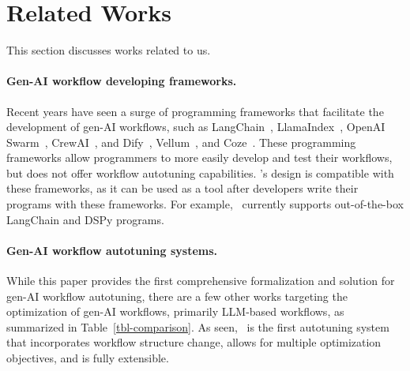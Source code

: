\section{Related Works}
\label{sec:related}
This section discusses works related to us.



\paragraph{Gen-AI workflow developing frameworks.}
Recent years have seen a surge of programming frameworks that facilitate the development of gen-AI workflows, such as LangChain~\cite{langchain-repo}, LlamaIndex~\cite{llamaindex}, OpenAI Swarm~\cite{swarm}, CrewAI~\cite{crewai}, and Dify~\cite{Dify}, Vellum~\cite{vellum}, and Coze~\cite{coze}.
These programming frameworks allow programmers to more easily develop and test their workflows, but does not offer workflow autotuning capabilities.
\sysname's design is compatible with these frameworks, as it can be used as a tool after developers write their programs with these frameworks. For example, \sysname\ currently supports out-of-the-box LangChain and DSPy programs.

\paragraph{Gen-AI workflow autotuning systems.}
While this paper provides the first comprehensive formalization and solution for gen-AI workflow autotuning, there are a few other works targeting the optimization of gen-AI workflows, primarily LLM-based workflows, as summarized in Table~\ref{tbl-comparison}. As seen, \sysname\ is the first autotuning system that incorporates workflow structure change, allows for multiple optimization objectives, and is fully extensible.

